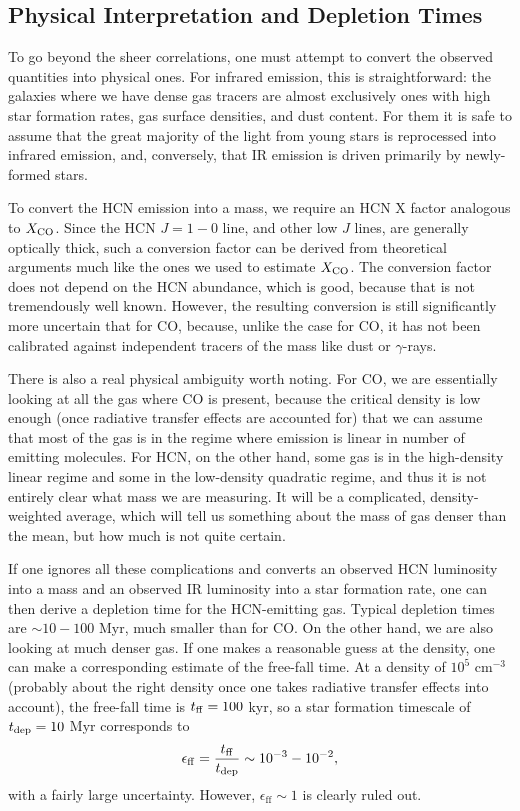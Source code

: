 \subsection{Physical Interpretation and Depletion Times}

To go beyond the sheer correlations, one must attempt to convert the observed quantities into physical ones. For infrared emission, this is straightforward: the galaxies where we have dense gas tracers are almost exclusively ones with high star formation rates, gas surface densities, and dust content. For them it is safe to assume that the great majority of the light from young stars is reprocessed into infrared emission, and, conversely, that IR emission is driven primarily by newly-formed stars.

To convert the HCN emission into a mass, we require an HCN X factor analogous to $X_{\rm CO}$. Since the HCN $J=1-0$ line, and other low $J$ lines, are generally optically thick, such a conversion factor can be derived from theoretical arguments much like the ones we used to estimate $X_{\rm CO}$. The conversion factor does not depend on the HCN abundance, which is good, because that is not tremendously well known. However, the resulting conversion is still significantly more uncertain that for CO, because, unlike the case for CO, it has not been calibrated against independent tracers of the mass like dust or $\gamma$-rays.

There is also a real physical ambiguity worth noting. For CO, we are essentially looking at all the gas where CO is present, because the critical density is low enough (once radiative transfer effects are accounted for) that we can assume that most of the gas is in the regime where emission is linear in number of emitting molecules. For HCN, on the other hand, some gas is in the high-density linear regime and some in the low-density quadratic regime, and thus it is not entirely clear what mass we are measuring. It will be a complicated, density-weighted average, which will tell us something about the mass of gas denser than the mean, but how much is not quite certain.

If one ignores all these complications and converts an observed HCN luminosity into a mass and an observed IR luminosity into a star formation rate, one can then derive a depletion time for the HCN-emitting gas. Typical depletion times are $\sim 10-100$ Myr, much smaller than for CO. On the other hand, we are also looking at much denser gas. If one makes a reasonable guess at the density, one can make a corresponding estimate of the free-fall time. At a density of $10^5$ cm$^{-3}$ (probably about the right density once one takes radiative transfer effects into account), the free-fall time is $t_{\rm ff} = 100$ kyr, so a star formation timescale of $t_{\rm dep} = 10$ Myr corresponds to
\begin{equation}
\epsilon_{\rm ff} = \frac{t_{\rm ff}}{t_{\rm dep}} \sim 10^{-3} - 10^{-2},
\end{equation}
with a fairly large uncertainty. However, $\epsilon_{\mathrm{ff}} \sim 1$ is clearly ruled out.

